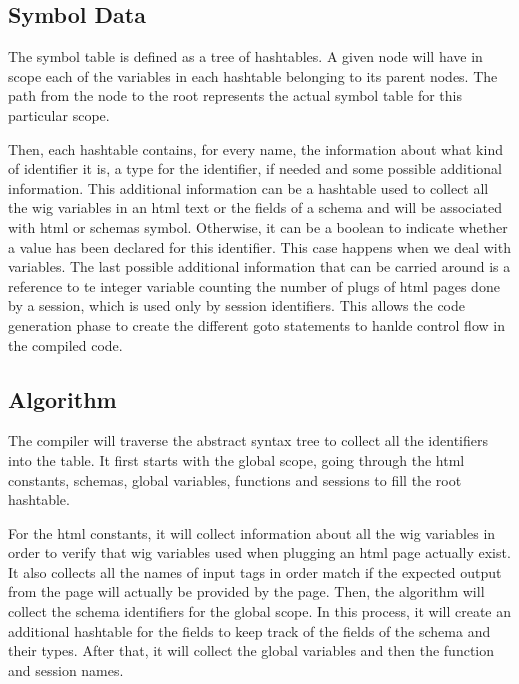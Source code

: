 \documentclass{WigReport}
\begin{document}
\subsection{Symbol Data \label{sec:symdata}}
The symbol table is defined as a tree of hashtables. A given node will have in scope each of the variables in each hashtable belonging to its parent nodes. The path from the node to the root represents the actual symbol table for this particular scope. 

Then, each hashtable contains, for every name, the information about what kind of identifier it is, a type for the identifier, if needed and some possible additional information. This additional information can be a hashtable used to collect all the wig variables in an html text or the fields of a schema and will be associated with html or schemas symbol. Otherwise, it can be a boolean to indicate whether a value has been declared for this identifier. This case happens when we deal with variables. The last possible additional information that can be carried around is a reference to te integer variable counting the number of plugs of html pages done by a session, which is used only by session identifiers. This allows the code generation phase to create the different goto statements to hanlde control flow in the compiled code.

\subsection{Algorithm}

The compiler will traverse the abstract syntax tree to collect all the identifiers into the table. It first starts with the global scope, going through the html constants, schemas, global variables, functions and sessions to fill the root hashtable. 

For the html constants, it will collect information about all the wig variables in order to verify that wig variables used when plugging an html page actually exist. It also collects all the names of input tags in order match if the expected output from the page will actually be provided by the page. Then, the algorithm will collect the schema identifiers for the global scope. In this process, it will create an additional hashtable for the fields to keep track of the fields of the schema and their types. After that, it will collect the global variables and then the function and session names.
\end{document}
